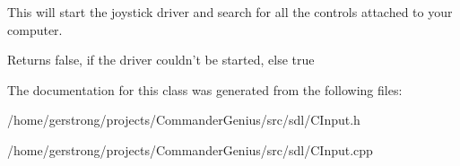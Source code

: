 This will start the joystick driver and search for all the controls attached to your computer. 

\begin{DoxyReturn}{Returns}
false, if the driver couldn't be started, else true 
\end{DoxyReturn}


The documentation for this class was generated from the following files:\begin{DoxyCompactItemize}
\item 
/home/gerstrong/projects/CommanderGenius/src/sdl/CInput.h\item 
/home/gerstrong/projects/CommanderGenius/src/sdl/CInput.cpp\end{DoxyCompactItemize}
